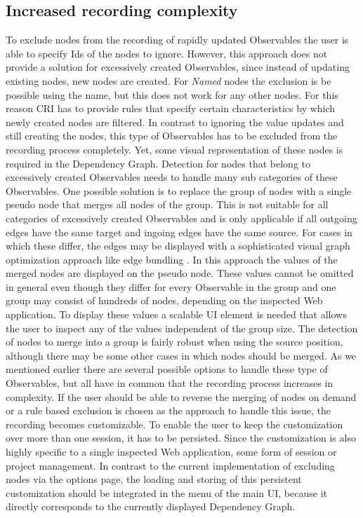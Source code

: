 \subsection{Increased recording complexity}
To exclude nodes from the recording of rapidly updated Observables the user is able to specify Ids of the nodes to ignore. However, this approach does not provide a solution for excessively created Observables, since instead of updating existing nodes, new nodes are created. For \emph{Named} nodes the exclusion is be possible using the name, but this does not work for any other nodes. For this reason CRI has to provide rules that specify certain characteristics by which newly created nodes are filtered. In contrast to ignoring the value updates and still creating the nodes, this type of Observables has to be excluded from the recording process completely. Yet, some visual representation of these nodes is required in the Dependency Graph. Detection for nodes that belong to excessively created Observables needs to handle many sub categories of these Observables. One possible solution is to replace the group of nodes with a single pseudo node that merges all nodes of the group. This is not suitable for all categories of excessively created Observables and is only applicable if all outgoing edges have the same target and ingoing edges have the same source. For cases in which these differ, the edges may be displayed with a sophisticated visual graph optimization approach like edge bundling \cite{EdgeBundling}. In this approach the values of the merged nodes are displayed on the pseudo node. These values cannot be omitted in general even though they differ for every Observable in the group and one group may consist of hundreds of nodes, depending on the inspected Web application. To display these values a scalable UI element is needed that allows the user to inspect any of the values independent of the group size. The detection of nodes to merge into a group is fairly robust when using the source position, although there may be some other cases in which nodes should be merged. As we mentioned earlier there are several possible options to handle these type of Observables, but all have in common that the recording process increases in complexity. If the user should be able to reverse the merging of nodes on demand or a rule based exclusion is chosen as the approach to handle this issue, the recording becomes customizable. To enable the user to keep the customization over more than one session, it has to be persisted. Since the customization is also highly specific to a single inspected Web application, some form of session or project management. In contrast to the current implementation of excluding nodes via the options page, the loading and storing of this persistent customization should be integrated in the menu of the main UI, because it directly corresponds to the currently displayed Dependency Graph.
	
